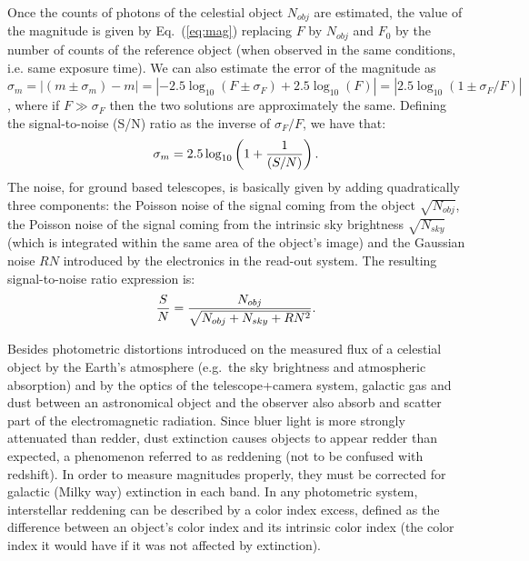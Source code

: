 Once the counts of photons of the celestial object $N_{obj}$ are estimated, the value of the magnitude is given by Eq.~(\ref{eq:mag}) replacing $F$ by $N_{obj}$ and $F_0$ by the number of counts of the reference object (when observed in the same conditions, i.e. same exposure time). We can also estimate the error of the magnitude as $\sigma_m = |(m \pm \sigma_m) - m| = |- 2.5\log_{10}(F\pm \sigma_F) + 2.5\log_{10}(F)| = |2.5\log_{10}(1 \pm \sigma_F/F)|$, 
where if $F\gg\sigma_F$ then the two solutions are approximately the same. Defining the signal-to-noise (S/N) ratio as the inverse of $\sigma_F/F$, we have that:
\begin{equation}
\sigma_m = 2.5\log_{10}\left(1+{1\over(S/N)}\right).
\end{equation}
The noise, for ground based telescopes, is basically given by adding quadratically three components: the Poisson noise of the signal coming from the object $\sqrt{N_{obj}}$, the Poisson noise of the signal coming from the intrinsic sky brightness $\sqrt{N_{sky}}$ (which is integrated within the same area of the object's image) and the Gaussian noise $RN$ introduced by the electronics in the read-out system. The resulting signal-to-noise ratio expression is:
\begin{equation}
{S \over N} = {N_{obj}\over \sqrt{N_{obj}+N_{sky}+RN^2}}.
\end{equation}

Besides photometric distortions introduced on the measured flux of a celestial object by the Earth's atmosphere (e.g.~the sky brightness and atmospheric absorption) and by the optics of the telescope+camera system, galactic gas and dust between an astronomical object and the observer also absorb and scatter part of the electromagnetic radiation. Since bluer light is more strongly attenuated than redder, dust extinction causes objects to appear redder than expected, a phenomenon referred to as reddening (not to be confused with redshift). In order to measure magnitudes properly, they must be corrected for galactic (Milky way) extinction in each band. In any photometric system, interstellar reddening can be described by a color index excess, defined as the difference between an object's color index and its intrinsic color index (the color index it would have if it was not affected by extinction).

